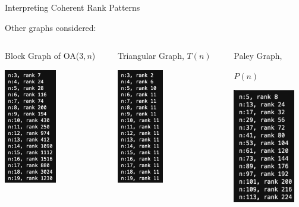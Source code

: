 \documentclass{beamer}
\begin{document}
\begin{frame}{Interpreting Coherent Rank Patterns}

Other graphs considered:

\vspace{1em}
\begin{columns}
\begin{column}{0.3\textwidth}
\centering
    Block Graph of OA($3,n$)

    \vspace{1em}
    \includegraphics[height=5cm]{slides/OA(3,n).jpg}
\end{column}

\begin{column}{0.3\textwidth}
\centering
    Triangular Graph, $T(n)$
    
    \vspace{1em}
    \includegraphics[height=5cm]{slides/T(n).jpg}
\end{column}

\begin{column}{0.3\textwidth}
\centering
    Paley Graph, 
    
    $P(n)$
    
    \vspace{1em}
    \includegraphics[height=5cm]{slides/Paley.jpg}
\end{column}
\end{columns}


\end{frame}
\end{document}
